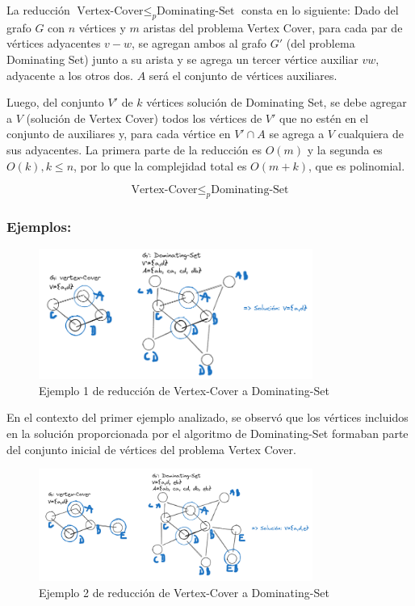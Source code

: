 La reducción $\text{Vertex-Cover} \leq _{p} \text{Dominating-Set}$ consta en lo siguiente:
Dado del grafo $G$ con $n$ vértices y $m$ aristas del problema Vertex Cover, para cada par de 
vértices adyacentes $v-w$, se agregan ambos al grafo $G'$ (del problema Dominating Set) junto a 
su arista y se agrega un tercer vértice auxiliar $vw$, adyacente a los otros dos. $A$ será el 
conjunto de vértices auxiliares. 

Luego, del conjunto $V'$ de $k$ vértices solución de Dominating Set, se debe agregar a $V$ (solución de Vertex Cover) todos los vértices de $V'$ que no estén en el conjunto de auxiliares y, para cada vértice en $V' \cap A$ se agrega a $V$  cualquiera de sus adyacentes. La primera parte de la reducción es $O(m)$ y la segunda es $O(k),k \leq n$, por lo que la complejidad total es $O(m+k)$, que es polinomial.

\[\text{Vertex-Cover} \leq _{p} \text{Dominating-Set}\]

\subsubsection{Ejemplos:} 
\begin{figure}[H]
    \centering
    \includegraphics[width=0.8\textwidth]{img/ejemplo1_VC-DS.png}
    \caption{Ejemplo 1 de reducción de Vertex-Cover a Dominating-Set}
    \label{fig:ejemplo1_VC-DS}
\end{figure}

En el contexto del primer ejemplo analizado, se observó que los vértices incluidos en la solución proporcionada por el algoritmo de Dominating-Set formaban parte del conjunto inicial de vértices del problema Vertex Cover. 

\begin{figure}[H]
    \centering
    \includegraphics[width=0.8\textwidth]{img/ejemplo2_VC-DS.png}
    \caption{Ejemplo 2 de reducción de Vertex-Cover a Dominating-Set}
    \label{fig:ejemplo2_VC-DS}
\end{figure}

